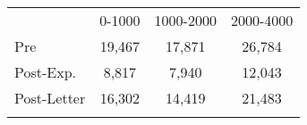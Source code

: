 \begin{center}
\begin{tabular}{lccc}
\hline \noalign{\smallskip} & 0-1000 & 1000-2000 & 2000-4000\\
\noalign{\smallskip}\hline Pre & 19,467 & 17,871 & 26,784\\
Post-Exp. & 8,817 & 7,940 & 12,043\\
\noalign{\smallskip}Post-Letter & 16,302 & 14,419 & 21,483\\
\noalign{\smallskip}\hline\end{tabular}\\
\end{center}
